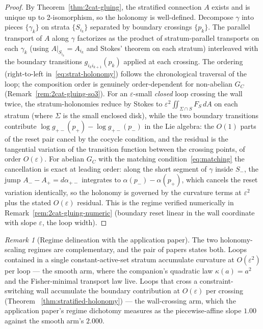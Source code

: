 \documentclass[11pt,a4paper]{article}
\theoremstyle{plain}
\theoremstyle{definition}
\theoremstyle{remark}
\newtheorem{remark}[theorem]{Remark}
\begin{document}
\begin{proof}
By Theorem~\ref{thm:2cat-gluing}, the stratified connection $A$ exists
and is unique up to 2-isomorphism, so the holonomy is well-defined.
Decompose $\gamma$ into pieces $\{\gamma_k\}$ on strata $\{S_{i_k}\}$
separated by boundary crossings $\{p_k\}$. The parallel transport
of $A$ along $\gamma$ factorizes as the product of stratum-parallel
transports on each $\gamma_k$ (using $A|_{S_{i_k}} = A_{i_k}$ and
Stokes' theorem on each stratum) interleaved with the boundary
transitions $g_{i_k i_{k+1}}(p_k)$ applied at each crossing. The
ordering (right-to-left in~\eqref{eq:strat-holonomy}) follows the
chronological traversal of the loop; the composition order is
genuinely order-dependent for non-abelian $G_C$
(Remark~\ref{rem:2cat-gluing-so3}). For an $\varepsilon$-small
\emph{closed} loop crossing the wall twice, the
stratum-holonomies reduce by Stokes to $\varepsilon^2 \iint_{\Sigma
\cap S} F_S\, dA$ on each stratum (where $\Sigma$ is the small
enclosed disk), while the two boundary transitions contribute
$\log g_{+-}(p_+) - \log g_{+-}(p_-)$ in the Lie algebra: the
$O(1)$ parts of the reset pair cancel by the cocycle condition, and
the residual is the tangential variation of the transition function
between the crossing points, of order $O(\varepsilon)$. For abelian
$G_C$ with the matching condition~\eqref{eq:matching} the
cancellation is exact at leading order: along the short segment of
$\gamma$ inside $S_-$, the jump $A_- - A_+ = d\alpha_{+-}$ integrates
to $\alpha(p_-) - \alpha(p_+)$, which cancels the reset variation
identically, so the holonomy is governed by the curvature terms at
$\varepsilon^2$ plus the stated $O(\varepsilon)$ residual. This is
the regime verified numerically in
Remark~\ref{rem:2cat-gluing-numeric} (boundary reset linear in the
wall coordinate with slope $\varepsilon$, the loop width).
\end{proof}

\begin{remark}[Regime delineation with the application paper]
\label{rem:regime-delineation}
The two holonomy-scaling regimes are complementary, and the pair of
papers states both. Loops contained in a single constant-active-set
stratum accumulate curvature at $O(\varepsilon^{2})$ per loop ---
the smooth arm, where the companion's quadratic law
$\kappa(a)=a^{2}$ and the Fisher-minimal transport law live.
Loops that cross a constraint-switching wall accumulate the
boundary contribution at $O(\varepsilon)$ per crossing (Theorem~%
\ref{thm:stratified-holonomy}) --- the wall-crossing arm, which the
application paper's regime dichotomy measures as the
piecewise-affine slope $1.00$ against the smooth arm's $2.000$.
\end{remark}
\end{document}
